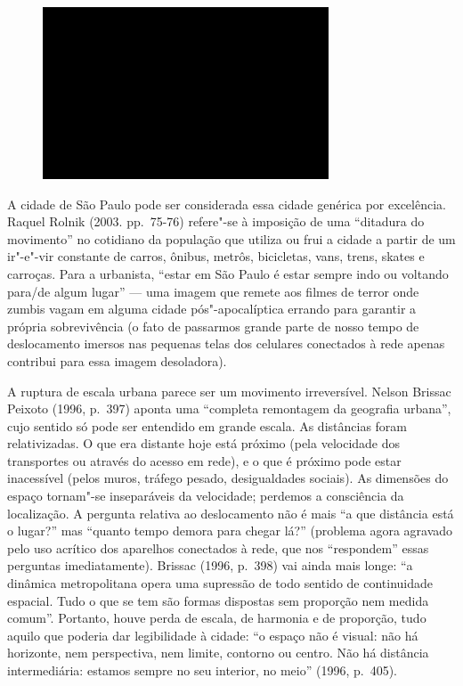 \begin{figure}[!ht]
\centering
 \includegraphics[width=85mm]{./imgs/im1.jpg}
\caption{\tiny{}}
\end{figure}

A cidade de São Paulo pode ser considerada essa cidade genérica por
excelência. Raquel Rolnik (2003. pp.~75-76) refere"-se à imposição de uma
``ditadura do movimento'' no cotidiano da população que utiliza ou frui
a cidade a partir de um ir"-e"-vir constante de carros, ônibus, metrôs,
bicicletas, vans, trens, skates e carroças. Para a urbanista, ``estar em
São Paulo é estar sempre indo ou voltando para/de algum lugar'' --- uma
imagem que remete aos filmes de terror onde zumbis vagam em alguma
cidade pós"-apocalíptica errando para garantir a própria sobrevivência (o
fato de passarmos grande parte de nosso tempo de deslocamento imersos
nas pequenas telas dos celulares conectados à rede apenas contribui para
essa imagem desoladora).

A ruptura de escala urbana parece ser um movimento irreversível. Nelson
Brissac Peixoto (1996, p.~397) aponta uma ``completa remontagem da
geografia urbana'', cujo sentido só pode ser entendido em grande escala.
As distâncias foram relativizadas. O que era distante hoje está próximo
(pela velocidade dos transportes ou através do acesso em rede), e o que
é próximo pode estar inacessível (pelos muros, tráfego pesado,
desigualdades sociais). As dimensões do espaço tornam"-se inseparáveis da
velocidade; perdemos a consciência da localização. A pergunta relativa
ao deslocamento não é mais ``a que distância está o lugar?'' mas
``quanto tempo demora para chegar lá?'' (problema agora agravado pelo
uso acrítico dos aparelhos conectados à rede, que nos ``respondem''
essas perguntas imediatamente). Brissac (1996, p.~398) vai ainda mais longe: ``a
dinâmica metropolitana opera uma supressão de todo sentido de
continuidade espacial. Tudo o que se tem são formas dispostas sem
proporção nem medida comum''. Portanto, houve perda de
escala, de harmonia e de proporção, tudo aquilo que poderia dar
legibilidade à cidade: ``o espaço não é visual: não há horizonte, nem
perspectiva, nem limite, contorno ou centro. Não há distância
intermediária: estamos sempre no seu interior, no meio'' (1996, p.~405).


